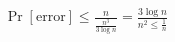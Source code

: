 \documentclass[preview]{standalone}
\begin{document}
\begin{align*}
\Pr[\text{error}] \leq \frac{n}{\frac{n^3}{3 \log n}} = \frac{3 \log n}{n^2 \leq \frac{1}{n}}
\end{align*}
\end{document}
